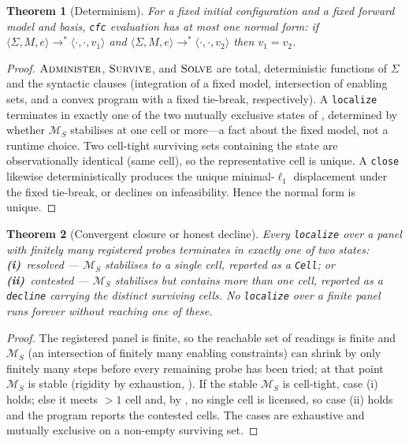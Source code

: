 \documentclass[11pt,a4paper]{article}
\theoremstyle{cfcthm}
\newtheorem{theorem}{Theorem}[section]
\theoremstyle{definition}
\theoremstyle{remark}
\newcommand{\Man}{\mathcal{M}}          %
\newcommand{\rec}{M}                    %
\newcommand{\stepto}{\longrightarrow}
\newcommand{\cf}[1]{\texttt{#1}}
\begin{document}
\begin{theorem}[Determinism]
\label{thm:determinism}
For a fixed initial configuration and a fixed forward model and basis, \cf{cfc}
evaluation has at most one normal form: if
$\langle\Sigma,\rec,e\rangle\stepto^{\ast}\langle\cdot,\cdot,v_1\rangle$ and
$\langle\Sigma,\rec,e\rangle\stepto^{\ast}\langle\cdot,\cdot,v_2\rangle$ then
$v_1=v_2$.
\end{theorem}

\begin{proof}
$\textsc{Administer}$, $\textsc{Survive}$, and $\textsc{Solve}$ are total,
deterministic functions of $\Sigma$ and the syntactic clauses (integration of a
fixed model, intersection of enabling sets, and a convex program with a fixed
tie-break, respectively). A \cf{localize} terminates in exactly one of the two
mutually exclusive states of , determined by whether
$\Man_S$ stabilises at one cell or more---a fact about the fixed model, not a
runtime choice. Two cell-tight surviving sets containing the state are
observationally identical (same cell), so the representative cell is unique. A
\cf{close} likewise deterministically produces the unique minimal-$\ell_1$
displacement under the fixed tie-break, or declines on infeasibility. Hence the
normal form is unique.
\end{proof}

\begin{theorem}[Convergent closure or honest decline]
\label{thm:decline}
Every \cf{localize} over a panel with finitely many registered probes
terminates in exactly one of two states: \textbf{(i)}~\emph{resolved} ---
$\Man_S$ stabilises to a single cell, reported as a \cf{Cell}; or
\textbf{(ii)}~\emph{contested} --- $\Man_S$ stabilises but contains more than
one cell, reported as a \cf{decline} carrying the distinct surviving cells. No
\cf{localize} over a finite panel runs forever without reaching one of these.
\end{theorem}

\begin{proof}
The registered panel is finite, so the reachable set of readings is finite and
$\Man_S$ (an intersection of finitely many enabling constraints) can shrink by
only finitely many steps before every remaining probe has been tried; at that
point $\Man_S$ is stable (rigidity by exhaustion, ). If the
stable $\Man_S$ is cell-tight, case (i) holds; else it meets $>1$ cell and, by
, no single cell is licensed, so case (ii) holds and the program
reports the contested cells. The cases are exhaustive and mutually exclusive on
a non-empty surviving set.
\end{proof}
\end{document}
